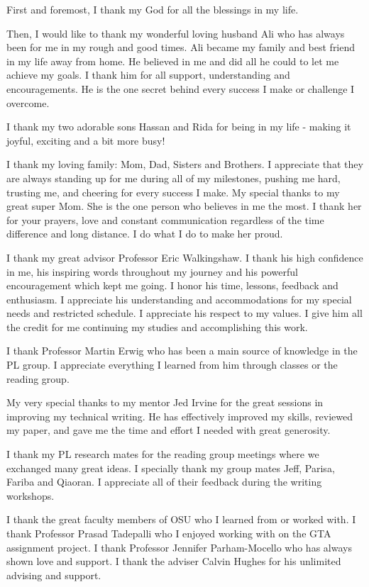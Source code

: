 
First and foremost, I thank my God for all the blessings in my life.

Then, I would like to thank my wonderful loving husband Ali who has always been for me in my rough and good times. Ali became my family and best friend in my life away from home. He believed in me and did all he could to let me achieve my goals. I thank him for all support, understanding and encouragements. He is the one secret behind every success I make or challenge I overcome. 

I thank my two adorable sons Hassan and Rida for being in my life - making it joyful, exciting and a bit more busy! 

I thank my loving family: Mom, Dad, Sisters and Brothers. I appreciate that they are always standing up for me during all of my milestones, pushing me hard, trusting me, and cheering for every success I make. My special thanks to my great super Mom. She is the one person who believes in me the most. I thank her for your prayers, love and constant communication regardless of the time difference and long distance. I do what I do to make her proud. 

I thank my great advisor Professor Eric Walkingshaw. I thank his high confidence in me, his inspiring words throughout my journey and his powerful encouragement which kept me going. I honor his time, lessons, feedback and enthusiasm. I appreciate his understanding and accommodations for my special needs and restricted schedule. I appreciate his respect to my values. I give him all the credit for me continuing my studies and accomplishing this work.

I thank Professor Martin Erwig who has been a main source of knowledge in the PL group. I appreciate everything I learned from him through classes or the reading group.

My very special thanks to my mentor Jed Irvine for the great sessions in improving my technical writing. He has effectively improved my skills, reviewed my paper, and gave me the time and effort I needed with great generosity.

I thank my PL research mates for the reading group meetings where we exchanged many great ideas. I specially thank my group mates Jeff, Parisa, Fariba and Qiaoran. I appreciate all of their feedback during the writing workshops. 

I thank the great faculty members of OSU who I learned from or worked with. I thank Professor Prasad Tadepalli who I enjoyed working with on the GTA assignment project. I thank Professor Jennifer Parham-Mocello who has always shown love and support. I thank the adviser Calvin Hughes for his unlimited advising and support.


